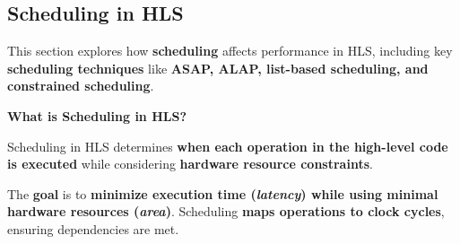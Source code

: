 \subsection{Scheduling in HLS}

This section explores how \textbf{scheduling} affects performance in HLS, including key \textbf{scheduling techniques} like \textbf{ASAP, ALAP, list-based scheduling, and constrained scheduling}.

\begin{flushleft}
    \textcolor{Green3}{ \textbf{What is Scheduling in HLS?}}
\end{flushleft}
Scheduling in HLS determines \textbf{when each operation in the high-level code is executed} while considering \textbf{hardware resource constraints}.

\highspace
The \textbf{goal} is to \textbf{minimize execution time (\emph{latency}) while using minimal hardware resources (\emph{area})}. Scheduling \textbf{maps operations to clock cycles}, ensuring dependencies are met.  

